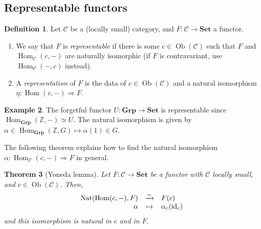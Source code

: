 \documentclass{article}
\newcommand{\id}{\mathrm{id}}
\newcommand{\Z}{\mathbb{Z}}
\newcommand{\cat}{\mathcal{C}}
\newcommand{\Set}{\mathbf{Set}}
\newcommand{\Grp}{\mathbf{Grp}}
\DeclareMathOperator{\Ob}{Ob}
\DeclareMathOperator{\Hom}{Hom}
\DeclareMathOperator{\Nat}{Nat}
\theoremstyle{plain}
\newtheorem{theorem}{Theorem}[section]
\theoremstyle{definition}
\newtheorem{definition}[theorem]{Definition}
\newtheorem{example}[theorem]{Example}
\theoremstyle{remark}
\begin{document}
\subsection{Representable functors}

\begin{definition}
    Let $\cat$ be a (locally small) category, and $F : \cat \to \Set$ a functor.
    \begin{enumerate}
        \item We say that $F$ is \emph{representable} if there is some $c \in \Ob(\cat)$ such that $F$ and $\Hom_\cat (c,-)$ are naturally isomorphic (if $F$ is contravariant, use $\Hom_\cat(-,c)$ instead).
        \item A \emph{representation} of $F$ is the data of $c \in \Ob(\cat)$ and a natural isomorphism $\eta : \Hom(c,-) \Rightarrow F$.
    \end{enumerate}
\end{definition}

\begin{example}
    The forgetful functor $U : \Grp \to \Set$ is representable since $\Hom_\Grp (\Z,-) \simeq U$. The natural isomorphism is given by $\alpha \in \Hom_\Grp (\Z,G) \mapsto \alpha(1) \in G$.
\end{example}

The following theorem explains how to find the natural isomorphism $\alpha : \Hom_\cat (c,-) \Rightarrow F$ in general.

\begin{theorem}[Yoneda lemma]
    Let $F : \cat \to \Set$ be a functor with $\cat$ locally small, and $c \in \Ob(\cat)$. Then,
    \[\begin{array}[t]{rcl}
        \Nat(\Hom(c,-),F) & \xrightarrow{\sim} & F(c)\\
        \alpha & \mapsto & \alpha_c(\id_c)
        \end{array}\]
    and this isomorphism is natural in $c$ and in $F$.
\end{theorem}
\end{document}
